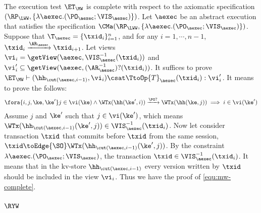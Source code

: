 The execution test $\ET_{\MW}$ is complete with respect to 
the axiomatic specification $(\RP_{\LWW}, \{\lambda \aexec.(\PO_{\aexec} ; \VIS_{\aexec})\})$. 
Let $\aexec$ be an abstract execution that satisfies the specification
$\CMa(\RP_{\LWW}, \{\lambda \aexec.(\PO_{\aexec} ; \VIS_{\aexec})\})$.
Suppose that $\T_{\aexec} = \{\txid_{i}\}_{i=1}^{n}$, and for any $i=1,\cdots, n-1$, $\txid_{i} \xrightarrow{\AR_{\aexec}} 
\txid_{i+1}$.
Let views \( \vi_{i} = \getView(\aexec, \VIS^{-1}_{\aexec}(\txid_{i}) ) \) and \( \vi'_{i} \subseteq \getView(\aexec, (\AR^{-1}_{\aexec})?(\txid_{i}) ) \).
It suffices to prove \( \ET_\MW \vdash (\hh_{\cut(\aexec, i-1)}, \vi_i ) \csat  \TtoOp{T}_{\aexec}(\txid_{i}) : \vi'_{i} \).
It means to prove the follows:
\begin{equation}
\label{equ:mw-complete}
\begin{array}{@{}l@{}}
    \fora{i,j,\ke, \ke' } j \in \vi(\ke)
    \wedge \WTx(\hh(\ke', i)) \xrightarrow{\PO?} \WTx(\hh(\ke, j)) 
    \implies i \in \vi(\ke')
\end{array}
\end{equation}
Assume \( j \) and \( \ke' \) such that \( j \in \vi(\ke')\), which means \( \WTx(\hh_{\cut(\aexec, i-1)}(\ke', j)) \in \VIS^{-1}_{\aexec}(\txid_{i}) \).
Now let consider transaction \( \txid \) that commits before \( \txid \) from the same session, \ie \( \txid \toEdge{\SO} \WTx(\hh_{\cut(\aexec, i-1)}(\ke', j)) \).
By the constraint \( \lambda \aexec.(\PO_{\aexec} ; \VIS_{\aexec}) \), the transaction \( \txid \in \VIS^{-1}_{\aexec}(\txid_{i}) \).
It means that in the kv-store \(  \hh_{\cut(\aexec, i-1)} \) every version written by \( \txid \) should be included in the view \( \vi_i \).
Thus we have the proof of \cref{equ:mw-complete}.

\subsubsection{ \( \RYW \) }

\label{sec:sound-complete-ryw}

